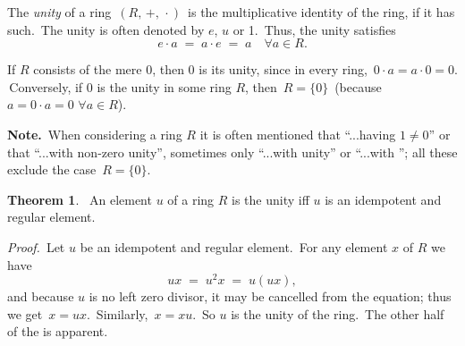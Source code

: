 \documentclass[12pt]{article}
\theoremstyle{definition}
\newtheorem*{thmplain}{Theorem}
\begin{document}
The {\em unity} of a ring \,$(R,\,+,\,\cdot)$\, is the multiplicative identity of the ring, if it has such. \,The unity is often denoted by $e$, $u$ or 1. \,Thus, the unity satisfies
   $$e\cdot a \;=\; a\cdot e \;=\; a\quad\forall a\in R.$$

If $R$ consists of the mere 0, then $0$ is its unity, since in every ring, \,$0\cdot a = a\cdot 0 = 0$. \,Conversely, if 0 is the unity in some ring $R$, then \,$R = \{0\}$\, (because \,$a = 0\cdot a = 0\,\,\forall a\in R$).

\textbf{Note.} \,When considering a ring $R$ it is often mentioned that ``...having $1 \neq 0$'' or that ``...with non-zero unity'', sometimes only ``...with unity'' or ``...with ''; all these exclude the case \,$R = \{0\}$.

\begin{thmplain}
\, An element $u$ of a ring $R$ is the unity iff $u$ is an idempotent and regular element.
\end{thmplain}

{\em Proof.} \,Let $u$ be an idempotent and regular element. \,For any element $x$ of $R$ we have
               $$ux \;=\; u^2x \;=\; u(ux),$$
and because $u$ is no left zero divisor, it may be cancelled from the equation; thus we get \,$x = ux$. \,Similarly,\, $x = xu$. \,So $u$ is the unity of the ring.\, The other half of the  is apparent.
\end{document}
